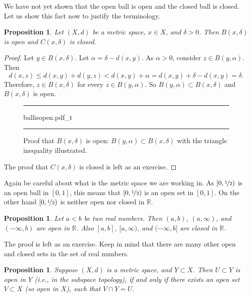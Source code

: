\documentclass[12pt,openany]{book}
\newcommand{\R}{{\mathbb{R}}}
\theoremstyle{plain}
\newtheorem{prop}[thm]{Proposition}
\theoremstyle{remark}
\theoremstyle{definition}
\newenvironment{myfig}{%
\begin{figure}[h!t]
\noindent\rule{\textwidth}{0.4pt}\vspace{12pt}\par\centering}%
{\par\noindent\rule{\textwidth}{0.4pt}
\end{figure}}
\theoremstyle{exercise}
\theoremstyle{example}
\begin{document}
We have not yet shown that the open ball is open and the closed ball is
closed.  Let us show this fact now to justify the terminology.

\begin{prop} \label{prop:topology:ballsopenclosed}
Let $(X,d)$ be a metric space, $x \in X$, and $\delta > 0$.  Then
$B(x,\delta)$ is open and 
$C(x,\delta)$ is closed.
\end{prop}

\begin{proof}
Let $y \in B(x,\delta)$.  Let $\alpha = \delta-d(x,y)$.  As $\alpha
> 0$, consider $z \in B(y,\alpha)$.  Then
\begin{equation*}
d(x,z) \leq d(x,y) + d(y,z) < d(x,y) + \alpha = d(x,y) + \delta-d(x,y) =
\delta .
\end{equation*}
Therefore, $z \in B(x,\delta)$ for every $z \in B(y,\alpha)$.  So $B(y,\alpha) \subset B(x,\delta)$ and
$B(x,\delta)$ is open.

\begin{myfig}
{ballisopen.pdf_t}
\caption{Proof that $B(x,\delta)$ is open: $B(y,\alpha) \subset
B(x,\delta)$ with the triangle inequality illustrated.\label{fig:ballisopen}}
\end{myfig}

The proof that $C(x,\delta)$ is closed is left as an exercise.
\end{proof}

Again be careful about what is the metric space we are working in.
As $[0,\nicefrac{1}{2})$ is
an open ball in $[0,1]$, this means that $[0,\nicefrac{1}{2})$ is
an open set in $[0,1]$.  On the other hand $[0,\nicefrac{1}{2})$
is neither open nor closed in $\R$.

\begin{prop} \label{prop:topology:intervals:openclosed}
Let $a < b$ be two real numbers.  Then $(a,b)$, $(a,\infty)$,
and $(-\infty,b)$ are open in $\R$.
Also $[a,b]$, $[a,\infty)$,
and $(-\infty,b]$ are closed in $\R$.
\end{prop}

The proof is left as an exercise.  Keep in mind that
there are many other open and
closed sets in the set of real numbers. %

\begin{prop} \label{prop:topology:subspaceopen}
Suppose $(X,d)$ is a metric space, and $Y \subset X$.  Then $U \subset Y$
is open in $Y$ (i.e., in the subspace topology), if and only if
there exists an open set $V \subset X$ (so open in $X$), such that
$V \cap Y = U$.
\end{prop}
\end{document}
